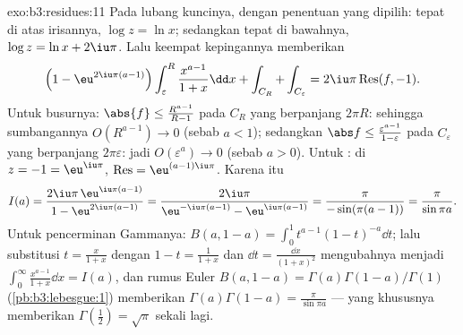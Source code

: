 \begin{solution}{exo:b3:residues:11}
Pada lubang kuncinya, dengan penentuan yang dipilih:
tepat di atas irisannya, $\log z = \ln x$; sedangkan tepat di bawahnya, $\log z =
\ln x + 2\iu\pi$. Lalu keempat kepingannya memberikan
\[
\Bigl(1 - \eu^{2\iu\pi(a-1)}\Bigr)\int_\varepsilon^R
\frac{x^{a-1}}{1+x}\dd x + \int_{C_R} + \int_{C_\varepsilon}
= 2\iu\pi\operatorname{Res}(f, -1) .
\]
Untuk busurnya: $\abs{f} \leq \frac{R^{a-1}}{R - 1}$ pada $C_R$ yang
berpanjang $2\pi R$: sehingga sumbangannya $O(R^{a-1}) \to 0$ (sebab $a < 1$);
sedangkan $\abs f \leq \frac{\varepsilon^{a-1}}{1 - \varepsilon}$ pada
$C_\varepsilon$ yang berpanjang $2\pi\varepsilon$: jadi $O(\varepsilon^a)
\to 0$ (sebab $a > 0$). Untuk : di $z = -1 = \eu^{\iu\pi}$,
$\operatorname{Res} = \eu^{(a-1)\iu\pi}$. Karena itu
\[
I(a) = \frac{2\iu\pi\,\eu^{\iu\pi(a-1)}}{1 -
\eu^{2\iu\pi(a-1)}}
= \frac{2\iu\pi}{\eu^{-\iu\pi(a-1)} - \eu^{\iu\pi(a-1)}}
= \frac{\pi}{-\sin(\pi(a-1))} = \frac{\pi}{\sin\pi a} .
\]
Untuk pencerminan Gammanya: $B(a, 1-a) =
\int_0^1t^{a-1}(1-t)^{-a}\dd t$; lalu substitusi $t =
\frac x{1+x}$ dengan $1 - t = \frac1{1+x}$ dan $\dd t =
\frac{\dd x}{(1+x)^2}$ mengubahnya menjadi $\int_0^\infty
\frac{x^{a-1}}{1+x}\dd x = I(a)$, dan rumus Euler
$B(a, 1-a) = \Gamma(a)\Gamma(1-a)/\Gamma(1)$
(\cref{pb:b3:lebesgue:1}) memberikan
$\Gamma(a)\Gamma(1-a) = \frac\pi{\sin\pi a}$ --- yang
khususnya memberikan $\Gamma(\tfrac12) = \sqrt\pi$ sekali lagi.

\end{solution}

